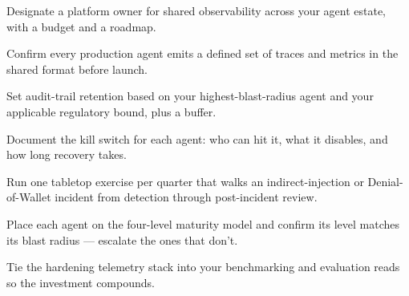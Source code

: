 \begin{TNchecklist}
\item Designate a platform owner for shared observability across your agent estate, with a budget and a roadmap.
\item Confirm every production agent emits a defined set of traces and metrics in the shared format before launch.
\item Set audit-trail retention based on your highest-blast-radius agent and your applicable regulatory bound, plus a buffer.
\item Document the kill switch for each agent: who can hit it, what it disables, and how long recovery takes.
\item Run one tabletop exercise per quarter that walks an indirect-injection or Denial-of-Wallet incident from detection through post-incident review.
\item Place each agent on the four-level maturity model and confirm its level matches its blast radius --- escalate the ones that don't.
\item Tie the hardening telemetry stack into your benchmarking and evaluation reads so the investment compounds.
\end{TNchecklist}


